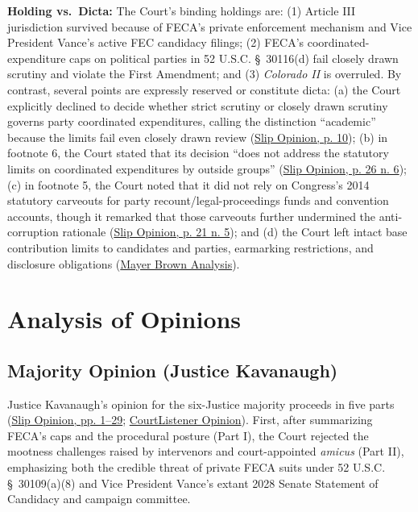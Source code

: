 \documentclass[12pt]{article}
\begin{document}
\textbf{Holding vs.\ Dicta:} The Court's binding holdings are: (1) Article III jurisdiction survived because of FECA's private enforcement mechanism and Vice President Vance's active FEC candidacy filings; (2) FECA's coordinated-expenditure caps on political parties in 52 U.S.C. \S~30116(d) fail closely drawn scrutiny and violate the First Amendment; and (3) \textit{Colorado II} is overruled. By contrast, several points are expressly reserved or constitute dicta: (a) the Court explicitly declined to decide whether strict scrutiny or closely drawn scrutiny governs party coordinated expenditures, calling the distinction ``academic'' because the limits fail even closely drawn review (\href{https://www.supremecourt.gov/opinions/25pdf/24-621_h315.pdf}{Slip Opinion, p. 10}); (b) in footnote 6, the Court stated that its decision ``does not address the statutory limits on coordinated expenditures by outside groups'' (\href{https://www.supremecourt.gov/opinions/25pdf/24-621_h315.pdf}{Slip Opinion, p. 26 n. 6}); (c) in footnote 5, the Court noted that it did not rely on Congress's 2014 statutory carveouts for party recount/legal-proceedings funds and convention accounts, though it remarked that those carveouts further undermined the anti-corruption rationale (\href{https://www.supremecourt.gov/opinions/25pdf/24-621_h315.pdf}{Slip Opinion, p. 21 n. 5}); and (d) the Court left intact base contribution limits to candidates and parties, earmarking restrictions, and disclosure obligations (\href{https://www.mayerbrown.com/en/insights/publications/2026/07/supreme-court-strikes-down-limits-on-political-party-coordinated-expenditures}{Mayer Brown Analysis}).

\section{Analysis of Opinions}

\subsection{Majority Opinion (Justice Kavanaugh)}
Justice Kavanaugh's opinion for the six-Justice majority proceeds in five parts (\href{https://www.supremecourt.gov/opinions/25pdf/24-621_h315.pdf}{Slip Opinion, pp. 1--29}; \href{https://www.courtlistener.com/opinion/10882240/national-republican-senatorial-committee-v-federal-election-commn/}{CourtListener Opinion}). First, after summarizing FECA's caps and the procedural posture (Part I), the Court rejected the mootness challenges raised by intervenors and court-appointed \textit{amicus} (Part II), emphasizing both the credible threat of private FECA suits under 52 U.S.C. \S~30109(a)(8) and Vice President Vance's extant 2028 Senate Statement of Candidacy and campaign committee.
\end{document}
